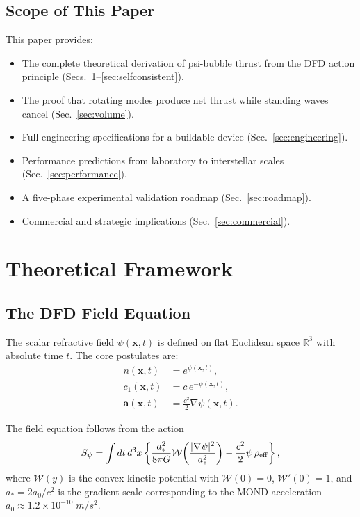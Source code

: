 \documentclass[twocolumn,prl,superscriptaddress,nofootinbib,longbibliography,floatfix]{revtex4-2}
\newcommand{\avec}{\mathbf{a}}
\newcommand{\astar}{a_*}
\newcommand{\Wfunc}{\mathcal{W}}
\begin{document}
\subsection{Scope of This Paper}

This paper provides:
\begin{itemize}[nosep]
\item The complete theoretical derivation of psi-bubble thrust from the
DFD action principle (Secs.~\ref{sec:theory}--\ref{sec:selfconsistent}).
\item The proof that rotating modes produce net thrust while standing
waves cancel (Sec.~\ref{sec:volume}).
\item Full engineering specifications for a buildable device
(Sec.~\ref{sec:engineering}).
\item Performance predictions from laboratory to interstellar scales
(Sec.~\ref{sec:performance}).
\item A five-phase experimental validation roadmap
(Sec.~\ref{sec:roadmap}).
\item Commercial and strategic implications
(Sec.~\ref{sec:commercial}).
\end{itemize}

\section{Theoretical Framework}\label{sec:theory}

\subsection{The DFD Field Equation}

The scalar refractive field $\psi(\mathbf{x},t)$ is defined on flat
Euclidean space $\mathbb{R}^3$ with absolute time $t$.  The core
postulates are:
\begin{align}
n(\mathbf{x},t) &= e^{\psi(\mathbf{x},t)},
\label{eq:n-def}\\
c_1(\mathbf{x},t) &= c\,e^{-\psi(\mathbf{x},t)},
\label{eq:c1-def}\\
\avec(\mathbf{x},t) &= \frac{c^2}{2}\nabla\psi(\mathbf{x},t).
\label{eq:a-def}
\end{align}

The field equation follows from the action
\begin{equation}
S_\psi = \int dt\,d^3x\left\{
  \frac{\astar^2}{8\pi G}\Wfunc\!\left(\frac{|\nabla\psi|^2}{\astar^2}
  \right)
  - \frac{c^2}{2}\psi\,\rho_{\rm eff}
\right\},
\label{eq:S-psi}
\end{equation}
where $\Wfunc(y)$ is the convex kinetic potential with $\Wfunc(0) = 0$,
$\Wfunc'(0) = 1$, and $\astar = 2a_0/c^2$ is the gradient scale
corresponding to the MOND acceleration
$a_0 \approx 1.2 \times 10^{-10}\;\si{m/s^2}$.
\end{document}
